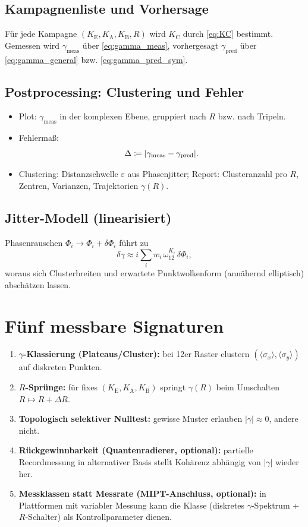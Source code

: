 \documentclass[11pt,a4paper]{article}
\newcommand{\wT}{\omega_{12}}
\newcommand{\EE}{\mathrm{E}}
\newcommand{\AA}{\mathrm{A}}
\newcommand{\BB}{\mathrm{B}}
\newcommand{\CC}{\mathrm{C}}
\begin{document}
	\subsection{Kampagnenliste und Vorhersage}
	
	Für jede Kampagne \((K_\EE,K_\AA,K_\BB,R)\) wird \(K_\CC\) durch \eqref{eq:KC} bestimmt. Gemessen wird
	\(\gamma_{\mathrm{meas}}\) über \eqref{eq:gamma_meas}, vorhergesagt \(\gamma_{\mathrm{pred}}\) über
	\eqref{eq:gamma_general} bzw. \eqref{eq:gamma_pred_sym}.
	
	\subsection{Postprocessing: Clustering und Fehler}
	
	\begin{itemize}
		\item Plot: \(\gamma_{\mathrm{meas}}\) in der komplexen Ebene, gruppiert nach \(R\) bzw. nach Tripeln.
		\item Fehlermaß:
		\[
		\Delta \coloneqq \abs{\gamma_{\mathrm{meas}}-\gamma_{\mathrm{pred}}}.
		\]
		\item Clustering: Distanzschwelle \(\varepsilon\) aus Phasenjitter; Report: Clusteranzahl pro \(R\),
		Zentren, Varianzen, Trajektorien \(\gamma(R)\).
	\end{itemize}
	
	\subsection{Jitter-Modell (linearisiert)}
	
	Phasenrauschen \(\Phi_i\to \Phi_i+\delta\Phi_i\) führt zu
	\[
	\delta\gamma \approx i\sum_i w_i\,\wT^{K_i}\,\delta\Phi_i,
	\]
	woraus sich Clusterbreiten und erwartete Punktwolkenform (annähernd elliptisch) abschätzen lassen.
	
	\section{Fünf messbare Signaturen}
	
	\begin{enumerate}
		\item \textbf{\(\gamma\)-Klassierung (Plateaus/Cluster):} bei 12er Raster clustern \((\langle\sigma_x\rangle,\langle\sigma_y\rangle)\)
		auf diskreten Punkten.
		\item \textbf{\(R\)-Sprünge:} für fixes \((K_\EE,K_\AA,K_\BB)\) springt \(\gamma(R)\) beim Umschalten \(R\mapsto R+\Delta R\).
		\item \textbf{Topologisch selektiver Nulltest:} gewisse Muster erlauben \(|\gamma|\approx 0\), andere nicht.
		\item \textbf{Rückgewinnbarkeit (Quantenradierer, optional):} partielle Recordmessung in alternativer Basis
		stellt Kohärenz abhängig von \(|\gamma|\) wieder her.
		\item \textbf{Messklassen statt Messrate (MIPT-Anschluss, optional):} in Plattformen mit variabler Messung
		kann die Klasse (diskretes \(\gamma\)-Spektrum + \(R\)-Schalter) als Kontrollparameter dienen.
	\end{enumerate}
	
\end{document}
